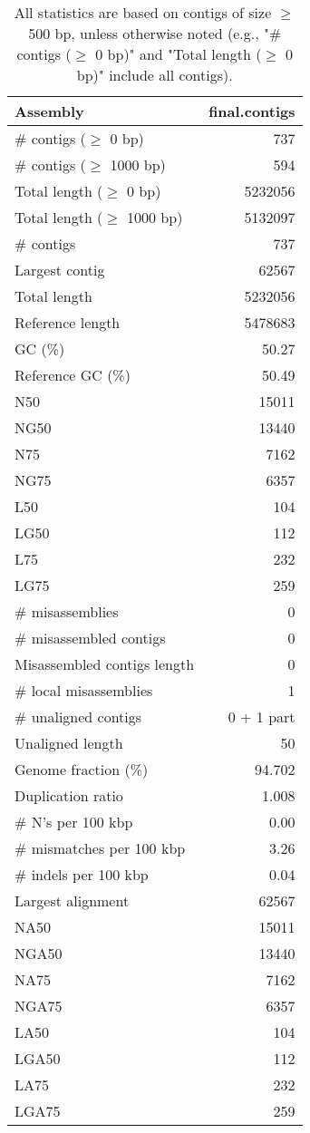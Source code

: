 \documentclass[12pt,a4paper]{article}
\begin{document}
\begin{table}[ht]
\begin{center}
\caption{All statistics are based on contigs of size $\geq$ 500 bp, unless otherwise noted (e.g., "\# contigs ($\geq$ 0 bp)" and "Total length ($\geq$ 0 bp)" include all contigs).}
\begin{tabular}{|l*{1}{|r}|}
\hline
Assembly & final.contigs \\ \hline
\# contigs ($\geq$ 0 bp) & 737 \\ \hline
\# contigs ($\geq$ 1000 bp) & 594 \\ \hline
Total length ($\geq$ 0 bp) & 5232056 \\ \hline
Total length ($\geq$ 1000 bp) & 5132097 \\ \hline
\# contigs & 737 \\ \hline
Largest contig & 62567 \\ \hline
Total length & 5232056 \\ \hline
Reference length & 5478683 \\ \hline
GC (\%) & 50.27 \\ \hline
Reference GC (\%) & 50.49 \\ \hline
N50 & 15011 \\ \hline
NG50 & 13440 \\ \hline
N75 & 7162 \\ \hline
NG75 & 6357 \\ \hline
L50 & 104 \\ \hline
LG50 & 112 \\ \hline
L75 & 232 \\ \hline
LG75 & 259 \\ \hline
\# misassemblies & 0 \\ \hline
\# misassembled contigs & 0 \\ \hline
Misassembled contigs length & 0 \\ \hline
\# local misassemblies & 1 \\ \hline
\# unaligned contigs & 0 + 1 part \\ \hline
Unaligned length & 50 \\ \hline
Genome fraction (\%) & 94.702 \\ \hline
Duplication ratio & 1.008 \\ \hline
\# N's per 100 kbp & 0.00 \\ \hline
\# mismatches per 100 kbp & 3.26 \\ \hline
\# indels per 100 kbp & 0.04 \\ \hline
Largest alignment & 62567 \\ \hline
NA50 & 15011 \\ \hline
NGA50 & 13440 \\ \hline
NA75 & 7162 \\ \hline
NGA75 & 6357 \\ \hline
LA50 & 104 \\ \hline
LGA50 & 112 \\ \hline
LA75 & 232 \\ \hline
LGA75 & 259 \\ \hline
\end{tabular}
\end{center}
\end{table}
\end{document}
